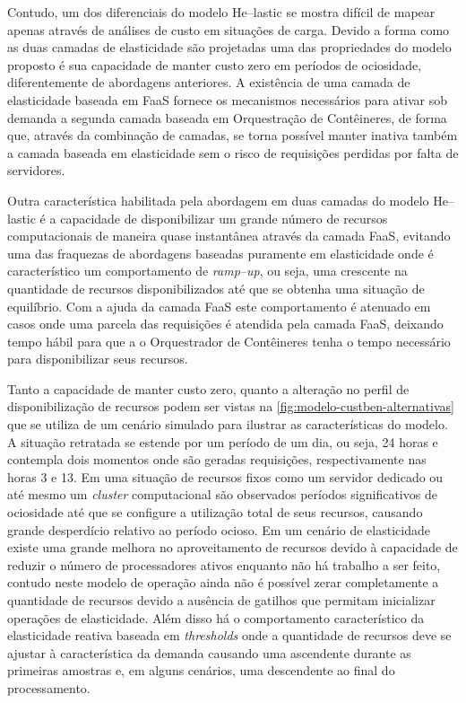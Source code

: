 \documentclass[english,brazilian]{UNISINOSmonografia} %
\begin{document}
Contudo, um dos diferenciais do modelo \textsf{He}--lastic se mostra difícil de mapear apenas através de análises de custo em situações de carga.
Devido a forma como as duas camadas de elasticidade são projetadas uma das propriedades do modelo proposto é sua capacidade de manter custo zero em períodos de ociosidade, diferentemente de abordagens anteriores.
A existência de uma camada de elasticidade baseada em FaaS fornece os mecanismos necessários para ativar sob demanda a segunda camada baseada em Orquestração de Contêineres, de forma que, através da combinação de camadas, se torna possível manter inativa também a camada baseada em elasticidade sem o risco de requisições perdidas por falta de servidores.


Outra característica habilitada pela abordagem em duas camadas do modelo \textsf{He}--lastic é a capacidade de disponibilizar um grande número de recursos computacionais de maneira quase instantânea através da camada FaaS, evitando uma das fraquezas de abordagens baseadas puramente em elasticidade onde é característico um comportamento de \textit{ramp--up}, ou seja, uma crescente na quantidade de recursos disponibilizados até que se obtenha uma situação de equilíbrio.
Com a ajuda da camada FaaS este comportamento é atenuado em casos onde uma parcela das requisições é atendida pela camada FaaS, deixando tempo hábil para que a o Orquestrador de Contêineres tenha o tempo necessário para disponibilizar seus recursos.


Tanto a capacidade de manter custo zero, quanto a alteração no perfil de disponibilização de recursos podem ser vistas na \autoref{fig:modelo-custben-alternativas} que se utiliza de um cenário simulado para ilustrar as características do modelo.
A situação retratada se estende por um período de um dia, ou seja, 24 horas e contempla dois momentos onde são geradas requisições, respectivamente nas horas 3 e 13.
Em uma situação de recursos fixos como um servidor dedicado ou até mesmo um \textit{cluster} computacional são observados períodos significativos de ociosidade até que se configure a utilização total de seus recursos, causando grande desperdício relativo ao período ocioso.
Em um cenário de elasticidade existe uma grande melhora no aproveitamento de recursos devido à capacidade de reduzir o número de processadores ativos enquanto não há trabalho a ser feito, contudo neste modelo de operação ainda não é possível zerar completamente a quantidade de recursos devido a ausência de gatilhos que permitam inicializar operações de elasticidade.
Além disso há o comportamento característico da elasticidade reativa baseada em \textit{thresholds} onde a quantidade de recursos deve se ajustar à característica da demanda causando uma ascendente durante as primeiras amostras e, em alguns cenários, uma descendente ao final do processamento.
\end{document}
